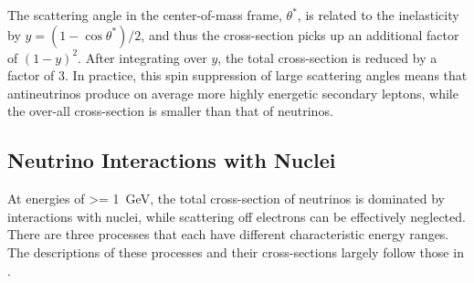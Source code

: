 The scattering angle in the center-of-mass frame, $\theta^*$, is related to the inelasticity by $y=(1-\cos\theta^*)/2$, and thus the cross-section picks up an additional factor of $(1 - y)^2$. After integrating over $y$, the total cross-section is reduced by a factor of 3. In practice, this spin suppression of large scattering angles means that antineutrinos produce on average more highly energetic secondary leptons, while the over-all cross-section is smaller than that of neutrinos.

\subsection{Neutrino Interactions with Nuclei}
\label{sec:neutrino-xsec}

At energies of \SI{>= 1}{\giga\eV}, the total cross-section of neutrinos is dominated by interactions with nuclei, while scattering off electrons can be effectively neglected. There are three processes that each have different characteristic energy ranges. The descriptions of these processes and their cross-sections largely follow those in .

